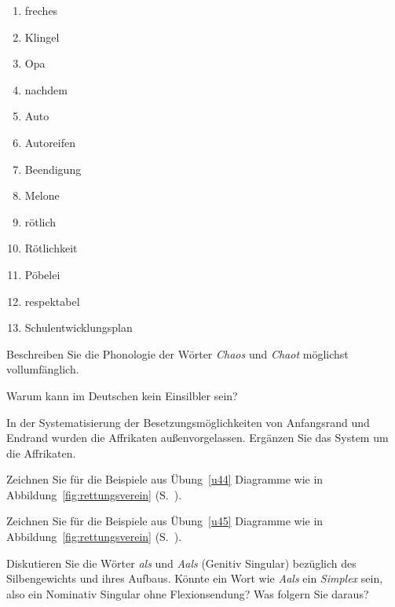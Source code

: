 \begin{enumerate}\Lf
  \item freches
  \item Klingel
  \item Opa
  \item nachdem
  \item Auto
  \item Autoreifen
  \item Beendigung
  \item Melone
  \item rötlich
  \item Rötlichkeit
  \item Pöbelei
  \item respektabel
  \item Schulentwicklungsplan
\end{enumerate}

\Uebung[\tristar] \label{u46} Beschreiben Sie die Phonologie der Wörter \textit{Chaos} und \textit{Chaot} möglichst vollumfänglich.

\Uebung \label{u47} Warum kann \textipa{[s5]} im Deutschen kein Einsilbler sein?

\Uebung[\tristar] \label{u48} In der Systematisierung der Besetzungsmöglichkeiten von Anfangsrand und Endrand wurden die Affrikaten außenvorgelassen.
Ergänzen Sie das System um die Affrikaten.

\Uebung[\tristar] \label{u49} Zeichnen Sie für die Beispiele aus Übung~\ref{u44} Diagramme wie in Abbildung~\ref{fig:rettungsverein} (S.~\pageref{fig:rettungsverein}).

\Uebung[\tristar] \label{u410} Zeichnen Sie für die Beispiele aus Übung~\ref{u45} Diagramme wie in Abbildung~\ref{fig:rettungsverein} (S.~\pageref{fig:rettungsverein}).

\Uebung[\tristar] \label{u411} Diskutieren Sie die Wörter \textit{als} und \textit{Aals} (Genitiv Singular) bezüglich des Silbengewichts und ihres Aufbaus.
Könnte ein Wort wie \textit{Aals} ein \textit{Simplex} sein, also \zB ein Nominativ Singular ohne Flexionsendung?
Was folgern Sie daraus?

